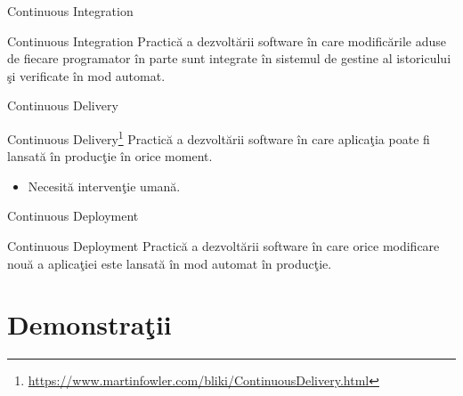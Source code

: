 \documentclass[presentation]{beamer}
\begin{document}
\begin{frame}[label={sec:org66bcacb}]{Continuous Integration}
\begin{block}{Continuous Integration}
\vskip 0.1in
Practică a dezvoltării software în care modificările aduse de fiecare programator în parte sunt integrate în sistemul de gestine al istoricului şi verificate în mod automat.
\end{block}
\end{frame}
\begin{frame}[label={sec:org4375936}]{Continuous Delivery}
\begin{block}{Continuous Delivery\footnote{\url{https://www.martinfowler.com/bliki/ContinuousDelivery.html}}}
\vskip 0.1in
Practică a dezvoltării software în care aplicaţia poate fi lansată în producţie în orice moment.
\begin{itemize}
\item Necesită intervenţie umană.
\end{itemize}
\end{block}
\end{frame}
\begin{frame}[label={sec:org616ee5f}]{Continuous Deployment}
\begin{block}{Continuous Deployment}
\vskip 0.1in
Practică a dezvoltării software în care orice modificare nouă a aplicaţiei este lansată în mod automat în producţie.
\end{block}
\end{frame}
\section{Demonstraţii}
\label{sec:org0322eb4}
\end{document}

